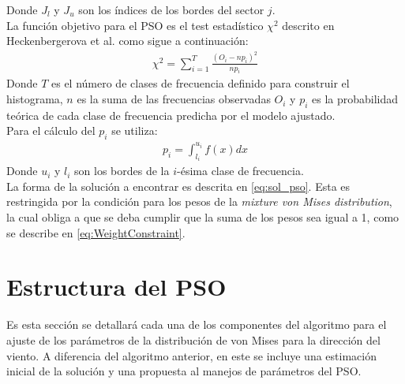 Donde $J_l$ y $J_u$ son los índices de los bordes del sector $j$.\\
La función objetivo para el PSO es el test estadístico $\chi^2$ descrito en Heckenbergerova et al. \cite{Heckenbergerova15} como sigue a continuación:
\begin{align}\label{eq:FO_Direction}
    \chi^2 = \sum_{i=1}^{T}\frac{(O_i - np_{i})^2}{np_i}
\end{align}
Donde $T$ es el número de clases de frecuencia definido para construir el histograma, $n$ es la suma de las frecuencias observadas $O_i$ y $p_i$ es la probabilidad teórica de cada clase de frecuencia predicha por el modelo ajustado.\\
Para el cálculo del $p_i$ se utiliza:
\begin{align}
    p_i = \int_{l_i}^{u_i} f(x) dx
\end{align}
Donde $u_i$ y $l_i$ son los bordes de la $i$-ésima clase de frecuencia.\\
La forma de la solución a encontrar es descrita en \ref{eq:sol_pso}. Esta es restringida por la condición para los pesos de la \emph{mixture von Mises distribution}, la cual obliga a que se deba cumplir que la suma de los pesos sea igual a 1, como se describe en \ref{eq:WeightConstraint}.

\section{Estructura del PSO}
Es esta sección se detallará cada una de los componentes del algoritmo para el ajuste de los parámetros de la distribución de von Mises para la dirección del viento. A diferencia del algoritmo anterior, en este se incluye una estimación inicial de la solución y una propuesta al manejos de parámetros del PSO.
